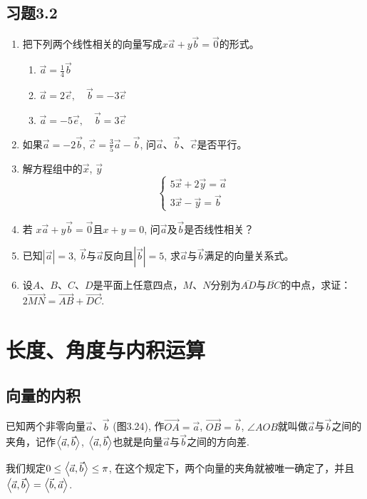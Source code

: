\subsection*{习题3.2}
\begin{enumerate}
    \item 把下列两个线性相关的向量写成$x\vec{a}+y\vec{b}=\vec{0}$的形式。
\begin{multicols}{3}
\begin{enumerate}
    \item $\vec{a}=\frac{1}{4}\vec{b}$
    \item $\vec{a}=2\vec{e},\quad \vec{b}=-3\vec{e}$
    \item $\vec{a}=-5\vec{e},\quad \vec{b}=3\vec{e}$
\end{enumerate}
\end{multicols}
\item 如果$\vec{a}=-2\vec{b}$, $\vec{c}=\frac{3}{5}\vec{a}-\vec{b}$, 问$\vec{a}$、$\vec{b}$、$\vec{c}$是否平行。
\item 解方程组中的$\vec{x}$, $\vec{y}$
\[\begin{cases}
    5\vec{x}+2\vec{y}=\vec{a}\\
    3\vec{x}-\vec{y}=\vec{b}
\end{cases}\]
\item 若 $x\vec{a}+y\vec{b}=\vec{0}$且$x+y=0$, 问$\vec{a}$及$\vec{b}$是否线性相关？
\item 已知$|\vec{a}|=3$, $\vec{b}$与$\vec{a}$反向且$|\vec{b}|=5$, 求$\vec{a}$与$\vec{b}$满足的向量关系式。
\item 设$A$、$B$、$C$、$D$是平面上任意四点，$M$、$N$分别为$\overline{AD}$与$\overline{BC}$的中点，求证：$2\Vec{MN}=\Vec{AB}+\Vec{DC}$.
\end{enumerate}

\section{长度、角度与内积运算}
\subsection{向量的内积}

已知两个非零向量$\vec{a}$、$\vec{b}$ (图3.24), 作$\Vec{OA}=\vec{a}$, $\Vec{OB}=\vec{b}$, $\angle AOB$就叫做$\vec{a}$与$\vec{b}$之间的夹角，记作$\left\langle \vec{a},\vec{b} \right\rangle$, $\left\langle \vec{a},\vec{b} \right\rangle$也就是向量$\vec{a}$与$\vec{b}$之间的方向差.

我们规定$0\le \left\langle \vec{a},\vec{b} \right\rangle\le \pi$, 在这个规定下，两个向量的夹角就被唯一确定了，并且$\left\langle \vec{a},\vec{b} \right\rangle=\left\langle \vec{b},\vec{a} \right\rangle$.

